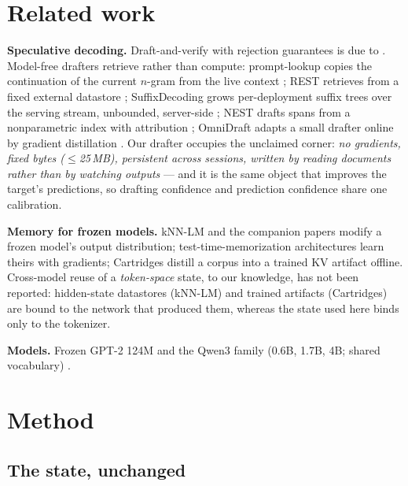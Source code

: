 \documentclass[11pt]{article}
\begin{document}
\section{Related work}

\textbf{Speculative decoding.} Draft-and-verify with rejection guarantees is due to \cite{leviathan,chen}. Model-free drafters retrieve rather than compute: prompt-lookup copies the continuation of the current $n$-gram from the live context \cite{pld}; REST retrieves from a fixed external datastore \cite{rest}; SuffixDecoding grows per-deployment suffix trees over the serving stream, unbounded, server-side \cite{suffix}; NEST drafts spans from a nonparametric index with attribution \cite{nest}; OmniDraft adapts a small drafter online by gradient distillation \cite{omnidraft}. Our drafter occupies the unclaimed corner: \emph{no gradients, fixed bytes ($\le$25\,MB), persistent across sessions, written by reading documents rather than by watching outputs} --- and it is the same object that improves the target's predictions, so drafting confidence and prediction confidence share one calibration.

\textbf{Memory for frozen models.} kNN-LM \cite{khandelwal2020} and the companion papers \cite{sillage,router,hier,fw} modify a frozen model's output distribution; test-time-memorization architectures \cite{titans,ttt} learn theirs with gradients; Cartridges \cite{cartridges} distill a corpus into a trained KV artifact offline. Cross-model reuse of a \emph{token-space} state, to our knowledge, has not been reported: hidden-state datastores (kNN-LM) and trained artifacts (Cartridges) are bound to the network that produced them, whereas the state used here binds only to the tokenizer.

\textbf{Models.} Frozen GPT-2 124M \cite{gpt2} and the Qwen3 family (0.6B, 1.7B, 4B; shared vocabulary) \cite{qwen3}.

\section{Method}

\subsection{The state, unchanged}
\end{document}
